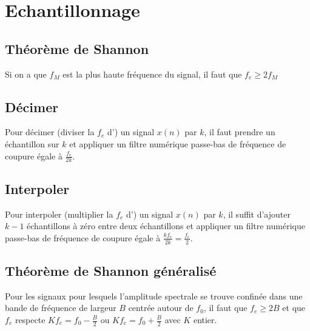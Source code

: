 \section{Echantillonnage}
    \subsection{Théorème de Shannon}
        Si on a que $f_M$ est la plus haute fréquence du signal, il faut que $f_e \geq 2 f_M$

    \subsection{Décimer}
        Pour décimer (diviser la $f_e$ d') un signal $x(n)$ par $k$, il faut prendre un échantillon sur $k$ et appliquer un filtre numérique passe-bas de fréquence de coupure égale à $\frac{f_e}{2k}$.

    \subsection{Interpoler}
        Pour interpoler (multiplier la $f_e$ d') un signal $x(n)$ par $k$, il suffit d'ajouter $k-1$ échantillons à zéro entre deux échantillons et appliquer un filtre numérique passe-bas de fréquence de coupure égale à $\frac{kf_e}{2k} = \frac{f_e}{2}$.

    \subsection{Théorème de Shannon généralisé}
        Pour les signaux pour lesquels l'amplitude spectrale se trouve confinée dans une bande de fréquence de largeur $B$ centrée autour de $f_0$, il faut que $f_e \geq 2B$ et que $f_e$ respecte $Kf_e = f_0 - \frac{B}{2}$ ou $Kf_e = f_0 + \frac{B}{2}$ avec $K$ entier.